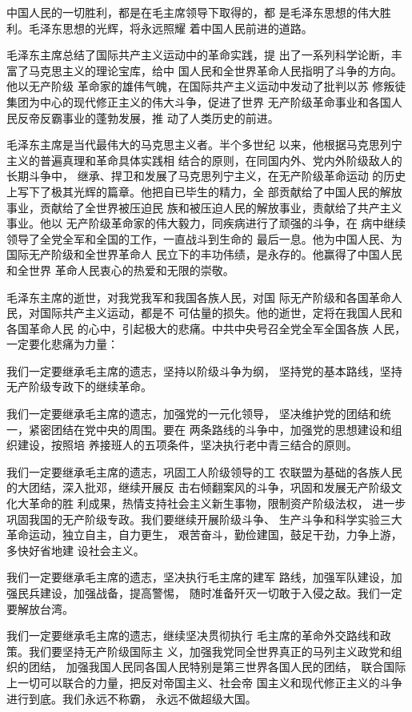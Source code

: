 \begin{hongqiarticle}
  中国人民的一切胜利，都是在毛主席领导下取得的，都
  是毛泽东思想的伟大胜利。毛泽东思想的光辉，将永远照耀
  着中国人民前进的道路。

  毛泽东主席总结了国际共产主义运动中的革命实践，提
  出了一系列科学论断，丰富了马克思主义的理论宝库，给中
  国人民和全世界革命人民指明了斗争的方向。他以无产阶级
  革命家的雄伟气魄，在国际共产主义运动中发动了批判以苏
  修叛徒集团为中心的现代修正主义的伟大斗争，促进了世界
  无产阶级革命事业和各国人民反帝反霸事业的蓬勃发展，推
  动了人类历史的前进。

  毛泽东主席是当代最伟大的马克思主义者。半个多世纪
  以来，他根据马克思列宁主义的普遍真理和革命具体实践相
  结合的原则，在同国内外、党内外阶级敌人的长期斗争中，
  继承、捍卫和发展了马克思列宁主义，在无产阶级革命运动
  的历史上写下了极其光辉的篇章。他把自已毕生的精力，全
  部贡献给了中国人民的解放事业，贡献给了全世界被压迫民
  族和被压迫人民的解放事业，责献给了共产主义事业。他以
  无产阶级革命家的伟大毅力，同疾病进行了顽强的斗争，在
  病中继续领导了全党全军和全国的工作，一直战斗到生命的
  最后一息。他为中国人民、为国际无产阶级和全世界革命人
  民立下的丰功伟绩，是永存的。他赢得了中国人民和全世界
  革命人民衷心的热爱和无限的崇敬。

  毛泽东主席的逝世，对我党我军和我国各族人民，对国
  际无产阶级和各国革命人民，对国际共产主义运动，都是不
  可估量的损失。他的逝世，定将在我国人民和各国革命人民
  的心中，引起极大的悲痛。中共中央号召全党全军全国各族
  人民，一定要化悲痛为力量：

  我们一定要继承毛主席的遗志，坚持以阶级斗争为纲，
  坚持党的基本路线，坚持无产阶级专政下的继续革命。

  我们一定要继承毛主席的遗志，加强党的一元化领导，
  坚决维护党的团结和统一，紧密团结在党中央的周围。要在
  两条路线的斗争中，加强党的思想建设和组织建设，按照培
  养接班人的五项条件，坚决执行老中青三结合的原则。

  我们一定要继承毛主席的遗志，巩固工人阶级领导的工
  农联盟为基础的各族人民的大团结，深入批邓，继续开展反
  击右倾翻案风的斗争，巩固和发展无产阶级文化大革命的胜
  利成果，热情支持社会主义新生事物，限制资产阶级法权，
  进一步巩固我国的无产阶级专政。我们要继续开展阶级斗争、
  生产斗争和科学实验三大革命运动，独立自主，自力更生，
  艰苦奋斗，勤俭建国，鼓足干劲，力争上游，多快好省地建
  设社会主义。

  我们一定要继承毛主席的遗志，坚决执行毛主席的建军
  路线，加强军队建设，加强民兵建设，加强战备，提高警惕，
  随时准备歼灭一切敢于入侵之敌。我们一定要解放台湾。

  我们一定要继承毛主席的遗志，继续坚决贯彻执行
  毛主席的革命外交路线和政策。我们要坚持无产阶级国际主
  义，加强我党同全世界真正的马列主义政党和组织的团结，
  加强我国人民同各国人民特别是第三世界各国人民的团结，
  联合国际上一切可以联合的力量，把反对帝国主义、社会帝
  国主义和现代修正主义的斗争进行到底。我们永远不称霸，
  永远不做超级大国。


\end{hongqiarticle}
